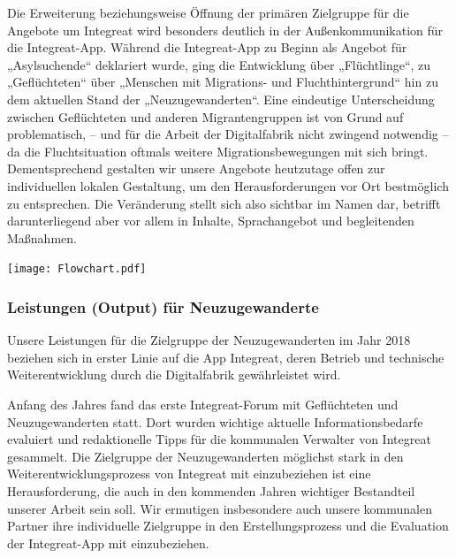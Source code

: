 \documentclass[12pt, a4paper]{article} %
\begin{document}
Die Erweiterung beziehungsweise Öffnung der primären Zielgruppe für die
Angebote um Integreat wird besonders deutlich in der Außenkommunikation
für die Integreat-App. Während die Integreat-App zu Beginn als Angebot
für „Asylsuchende“ deklariert wurde, ging die Entwicklung über
„Flüchtlinge“, zu „Geflüchteten“ über „Menschen mit Migrations- und
Fluchthintergrund“ hin zu dem aktuellen Stand der „Neuzugewanderten“.
Eine eindeutige Unterscheidung zwischen Geflüchteten und anderen
Migrantengruppen ist von Grund auf problematisch, – und für die Arbeit
der Digitalfabrik nicht zwingend notwendig – da die Fluchtsituation
oftmals weitere Migrationsbewegungen mit sich bringt. Dementsprechend
gestalten wir unsere Angebote heutzutage offen zur individuellen lokalen
Gestaltung, um den Herausforderungen vor Ort bestmöglich zu entsprechen.
Die Veränderung stellt sich also sichtbar im Namen dar, betrifft
darunterliegend aber vor allem in Inhalte, Sprachangebot und begleitenden Maßnahmen.

\vspace{0.5cm}

\begin{minipage}[t]{\textwidth}
    \texttt{[image: Flowchart.pdf]}
\end{minipage}

\hypertarget{leistungen-output-fuxfcr-neuzugewanderte}{%
\subsubsection{Leistungen (Output) für
Neuzugewanderte}\label{leistungen-output-fuxfcr-neuzugewanderte}}

Unsere Leistungen für die Zielgruppe der Neuzugewanderten im Jahr 2018
beziehen sich in erster Linie auf die App Integreat, deren Betrieb und
technische Weiterentwicklung durch die Digitalfabrik gewährleistet wird.

Anfang des Jahres fand das erste Integreat-Forum mit Geflüchteten und
Neuzugewanderten statt. Dort wurden wichtige aktuelle
Informationsbedarfe evaluiert und redaktionelle Tipps für die kommunalen
Verwalter von Integreat gesammelt. Die Zielgruppe der Neuzugewanderten
möglichst stark in den Weiterentwicklungsprozess von Integreat mit
einzubeziehen ist eine Herausforderung, die auch in den kommenden Jahren
wichtiger Bestandteil unserer Arbeit sein soll. Wir ermutigen
insbesondere auch unsere kommunalen Partner ihre individuelle Zielgruppe
in den Erstellungsprozess und die Evaluation der Integreat-App mit
einzubeziehen.
\end{document}
